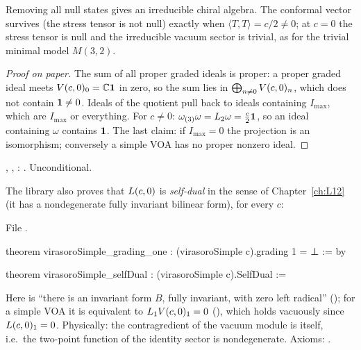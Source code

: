 \begin{physics}
Removing all null states gives an irreducible chiral algebra. The conformal vector survives (the stress
tensor is not null) exactly when $\langle T,T\rangle = c/2\ne0$; at $c = 0$ the stress tensor is null and
the irreducible vacuum sector is trivial, as for the trivial minimal model $M(3,2)$.
\end{physics}

\begin{proof}[Proof on paper]
The sum of all proper graded ideals is proper: a proper graded ideal meets $V(c,0)_0 = {\mathbb{C}}\mathbf{1}$ in
zero, so the sum lies in $\bigoplus_{n\ne0}V(c,0)_n$, which does not contain $\mathbf{1}\ne0$. Ideals of the
quotient pull back to ideals containing $I_{\max}$, which are $I_{\max}$ or everything. For $c\ne0$:
$\omega_{(3)}\omega = L_2\omega = \frac c2\mathbf{1}$, so an ideal containing $\omega$ contains $\mathbf{1}$.
The last claim: if $I_{\max} = 0$ the projection is an isomorphism; conversely a simple VOA has no
proper nonzero ideal.
\end{proof}

\begin{status}
\allowbreak{}\allowbreak{}\allowbreak{}, \allowbreak{}\allowbreak{}\allowbreak{},
\allowbreak{}\allowbreak{}: \lean{[propext, Classical.}\allowbreak{}\allowbreak\lean{sound]}. Unconditional.
\end{status}

The library also proves that $L(c,0)$ is \emph{self-dual} in the sense of Chapter~\ref{ch:L12} (it has a
nondegenerate fully invariant bilinear form), for every $c$:

File .
\begin{leancode}
theorem virasoroSimple_grading_one : (virasoroSimple c).grading 1 = ⊥ := by

theorem virasoroSimple_selfDual : (virasoroSimple c).SelfDual :=
\end{leancode}
Here  is ``there is an invariant form $B$, fully invariant, with zero left radical''
(); for a simple VOA it is equivalent to
$L_1V(c,0)_1 = 0$ (), which holds vacuously since $L(c,0)_1 = 0$. Physically: the
contragredient of the vacuum module is itself, i.e.\ the two-point function of the identity sector is
nondegenerate. Axioms: \lean{[propext, Classical.}\allowbreak{}\allowbreak\lean{sound]}.

